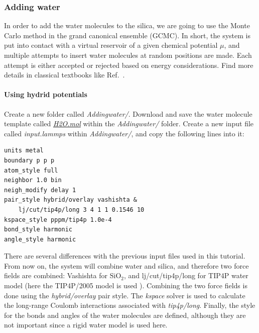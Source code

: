 \documentclass[9pt,tutorial]{livecoms}
\begin{document}
\subsubsection{Adding water}
\noindent In order to add the water molecules to the silica, we are going to use the Monte Carlo method in the grand canonical ensemble (GCMC). In short, the system is put into contact with a virtual reservoir of a given chemical potential $\mu$, and multiple attempts to insert water molecules at random positions are made. Each attempt is either accepted or rejected based on energy considerations. Find more details in classical textbooks like Ref.~.

\paragraph{Using hydrid potentials}
\noindent Create a new folder called \textit{Addingwater/}. Download and save the water molecule template called \href{https://raw.githubusercontent.com/lammpstutorials/lammpstutorials-article/main/files/tutorial6/H2O.mol}{\textit{H2O.mol}} within the \textit{Addingwater/} folder. Create a new input file called \textit{input.lammps} within \textit{Addingwater/}, and copy the following lines into it:
{\normalsize \begin{verbatim}
units metal
boundary p p p
atom_style full
neighbor 1.0 bin
neigh_modify delay 1
pair_style hybrid/overlay vashishta &
    lj/cut/tip4p/long 3 4 1 1 0.1546 10
kspace_style pppm/tip4p 1.0e-4
bond_style harmonic
angle_style harmonic
\end{verbatim}}
There are several differences with the previous input files used in this tutorial. From now on, the system will combine water and silica, and therefore two force fields are combined: Vashishta for $\text{SiO}_2$, and lj/cut/tip4p/long for TIP4P water model (here 
the TIP4P/2005 model is used \cite{abascal2005general}). Combining the two force fields is done using the \textit{hybrid/overlay} pair style. The \textit{kspace} solver is used to calculate the long-range Coulomb interactions associated with \textit{tip4p/long}. Finally, the style for the bonds and angles of the water molecules are defined, although they are not important since a rigid water model is used here.
\end{document}
